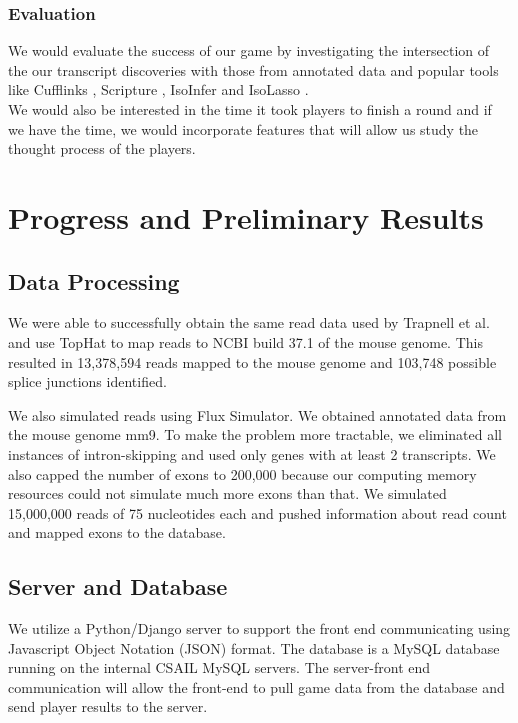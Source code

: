 \documentclass[12pt]{article}
\begin{document}
\subsubsection*{Evaluation}
We would evaluate the success of our game by investigating the intersection of the our transcript discoveries with those from annotated data and popular tools like Cufflinks \citep{trapnell2010transcript}, Scripture \citep{guttman2010ab} , IsoInfer \citep{feng2010inference} and IsoLasso \citep{li2011isolasso}. \\
We would also be interested in the time it took players to finish a round and if we have the time, we would incorporate features that will allow us study the thought process of the players.

\section*{Progress and Preliminary Results}

\subsection*{Data Processing}
We were able to successfully obtain the same read data used by Trapnell et al. \citep{trapnell2010transcript} and use TopHat to map reads to NCBI build 37.1 of the mouse genome.
This resulted in 13,378,594 reads mapped to the mouse genome and 103,748 possible splice junctions identified. 

We also simulated reads using Flux Simulator. We obtained annotated data from the mouse genome mm9. To make the problem more tractable, we eliminated all instances of intron-skipping and used only genes with at least 2 transcripts. We also capped the number of exons to 200,000 because our computing memory resources could not simulate much more exons than that. We simulated 15,000,000 reads of 75 nucleotides each and pushed information about read count and mapped exons to the database.

\subsection*{Server and Database}
We utilize a Python/Django server to support the front end communicating using Javascript Object Notation (JSON) format. The database is a MySQL database running on the internal CSAIL MySQL servers. The server-front end communication will allow the front-end to pull game data from the database and send player results to the server.
\end{document}
